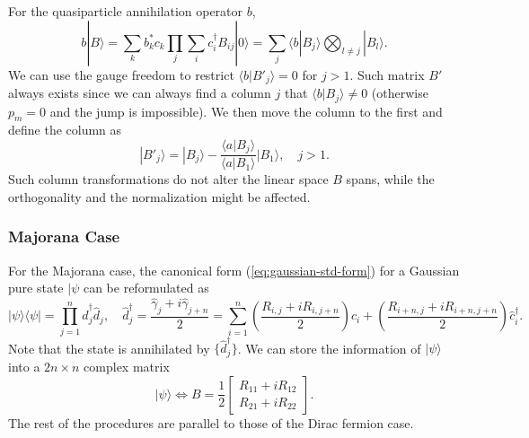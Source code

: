\documentclass[aps,prx,superscriptaddress,nofootinbib]{revtex4}
\begin{document}
For the quasiparticle annihilation operator $b$, 
\begin{equation}
	b|B\rangle = \sum_k b_k^* c_k \prod_{j} \sum_i c_i^\dagger B_{ij} |0\rangle
	=\sum_j \langle b|B_j\rangle \bigotimes_{l\ne j}|B_l\rangle.
\end{equation}
We can use the gauge freedom to restrict $\langle b| B'_{j}\rangle = 0$ for $j>1$. Such matrix $B'$ always exists since we can always find a column $j$ that $\langle b| B_{j}\rangle \ne 0$ (otherwise $p_m=0$ and the jump is impossible). We then move the column to the first and define the column as
\begin{equation}
	|B'_{j}\rangle = |B_{j}\rangle - \frac{\langle a|B_{j}\rangle}{\langle a|B_{1}\rangle} |B_{1}\rangle, \quad j>1.
\end{equation}
Such column transformations do not alter the linear space $B$ spans, while the orthogonality and the normalization might be affected. 


\subsubsection{Majorana Case}

For the Majorana case, the canonical form (\ref{eq:gaussian-std-form}) for a Gaussian pure state $|\psi$ can be reformulated as 
\begin{equation}
	|\psi\rangle\langle\psi| = \prod_{j=1}^n \hat d_j^\dagger \hat d_j, \quad
	\hat d_j^\dagger = \frac{\hat\gamma_j + i \hat\gamma_{j+n}}{2} = \sum_{i=1}^n \left(\frac{R_{i,j} + i R_{i,j+n}}{2}\right) \hat c_i + \left(\frac{R_{i+n,j} + iR_{i+n,j+n}}{2}\right) \hat c_i^\dagger.
\end{equation}
Note that the state is annihilated by $\{\hat d_j^\dagger\}$. We can store the information of $|\psi\rangle$ into a $2n\times n$ complex matrix
\begin{equation}
	|\psi\rangle \Longleftrightarrow B = \frac{1}{2} \begin{bmatrix}
		R_{11} + i R_{12} \\ R_{21} + i R_{22}
	\end{bmatrix}.
\end{equation}
The rest of the procedures are parallel to those of the Dirac fermion case.





\end{document}
